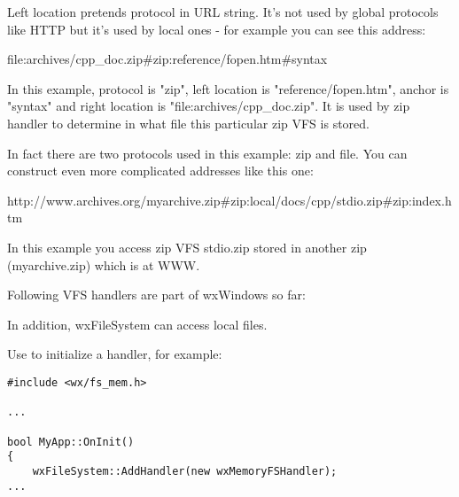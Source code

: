 
Left location pretends protocol in URL string. 
It's not used by global protocols like HTTP but it's used
by local ones - for example you can see this address:

file:archives/cpp\_doc.zip\#zip:reference/fopen.htm\#syntax

In this example, protocol is "zip", left location is
"reference/fopen.htm", anchor is "syntax" and right location
is "file:archives/cpp\_doc.zip". It is used by zip handler
to determine in what file this particular zip VFS is stored.

In fact there are two protocols used in this example: zip and file.
You can construct even more complicated addresses like this one:

http://www.archives.org/myarchive.zip\#zip:local/docs/cpp/stdio.zip\#zip:index.htm

In this example you access zip VFS stdio.zip stored in another zip (myarchive.zip)
which is at WWW.


Following VFS handlers are part of wxWindows so far:

\begin{twocollist}
\end{twocollist}

In addition, wxFileSystem can access local files.


Use  to initialize
a handler, for example:

\begin{verbatim}
#include <wx/fs_mem.h>

...

bool MyApp::OnInit()
{
    wxFileSystem::AddHandler(new wxMemoryFSHandler);
...
\end{verbatim}



